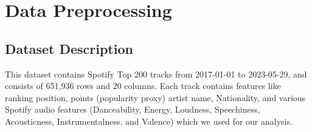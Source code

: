 \documentclass{article}
\begin{document}

\section{Data Preprocessing}
\subsection{Dataset Description}
This dataset contains Spotify Top 200 tracks from 2017-01-01 to 2023-05-29, and consists of 651,936 rows and 20 columns. Each track contains features like ranking position, points (popularity proxy) artist name, Nationality, and various Spotify audio features (Danceability, Energy, Loudness, Speechiness, Acousticness, Instrumentalness, and Valence) which we used for our analysis.
\end{document}
